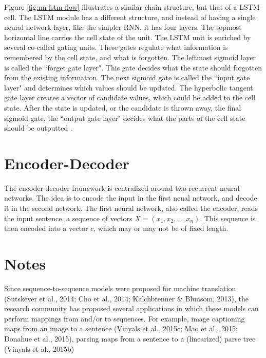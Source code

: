 Figure \ref{fig:nn-lstm-flow} illustrates a similar chain structure, but that of a LSTM cell. The LSTM module has a different structure, and instead of having a single neural network layer, like the simpler RNN, it has four layers. The topmost horizontal line carries the cell state of the unit. The LSTM unit is enriched by several co-called gating units. These gates regulate what information is remembered by the cell state, and what is forgotten. The leftmost sigmoid layer is called the ``forget gate layer". This gate decides what the state should forgotten from the existing information. The next sigmoid gate is called the ``input gate layer" and determines which values should be updated. The hyperbolic tangent gate layer creates a vector of candidate values, which could be added to the cell state. After the state is updated, or the candidate is thrown away, the final sigmoid gate, the ``output gate layer" decides what the parts of the cell state should be outputted \citep{hochreiter1997long, goodfellow2016deeplearning, olah2015lstm}.


\section{Encoder-Decoder}
\label{sec:encoder-decoder}

The encoder-decoder framework is centralized around two recurrent neural networks. The idea is to encode the input in the first neual network, and decode it in the second network. The first neural network, also called the encoder, reads the input sentence, a sequence of vectors \(X = (x_{1}, x_{2}, ..., x_{n})\). This sequence is then encoded into a vector \(c\), which may or may not be of fixed length.

\iffalse
\section{Notes}


Since sequence-to-sequence models were proposed for machine translation (Sutskever et al., 2014; Cho et al., 2014; Kalchbrenner & Blunsom, 2013), the research community has proposed several applications in which these models can perform mappings from and/or to sequences. For example, image captioning maps from an image to a sentence (Vinyals et al., 2015c; Mao et al., 2015; Donahue et al., 2015), parsing maps from a sentence to a (linearized) parse tree (Vinyals et al., 2015b)

